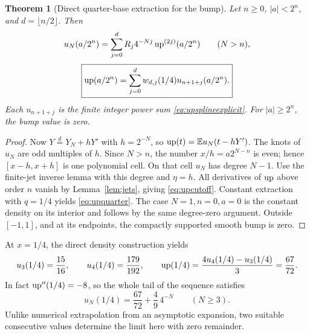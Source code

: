 \documentclass[11pt,oneside]{article}
\newtheorem{theorem}{Theorem}[section]
\theoremstyle{definition}\newtheorem{definition}[theorem]{Definition}
\theoremstyle{remark}\newtheorem{remark}[theorem]{Remark}
\begin{document}
\begin{theorem}[Direct quarter-base extraction for the bump]
\label{thm:upquarter}
Let $n\ge0$, $|a|<2^n$, and $d=\lfloor n/2\rfloor$. Then
\begin{equation}
 u_N(a/2^n)=\sum_{j=0}^{d}R_j4^{-Nj}\operatorname{up}^{(2j)}(a/2^n)
                  \qquad(N>n),
 \label{eq:upcutoff}
\end{equation}
\begin{equation}
 \boxed{\displaystyle
 \operatorname{up}(a/2^n)=\sum_{j=0}^{d}w_{d,j}(1/4)u_{n+1+j}(a/2^n).}
 \label{eq:upquarter}
\end{equation}
Each $u_{n+1+j}$ is the finite integer power sum
\eqref{eq:upsplineexplicit}. For $|a|\ge2^n$, the bump value is zero.
\end{theorem}
\begin{proof}
Now $Y\overset d=Y_N+hY'$ with $h=2^{-N}$, so
$\operatorname{up}(t)=\mathbb E u_N(t-hY')$. The knots of $u_N$ are odd multiples of $h$.
Since $N>n$, the number $x/h=a2^{N-n}$ is even; hence
$[x-h,x+h]$ is one polynomial cell. On that cell $u_N$ has degree $N-1$.
Use the finite-jet inverse lemma with this degree and $\eta=h$.
All derivatives of $\operatorname{up}$ above order $n$ vanish by Lemma~\ref{lem:jets},
giving \eqref{eq:upcutoff}. Constant extraction with $q=1/4$ yields
\eqref{eq:upquarter}. The case $N=1,n=0,a=0$ is the constant density on
its interior and follows by the same degree-zero argument. Outside
$[-1,1]$, and at its endpoints, the compactly supported smooth bump is zero.
\end{proof}

At $x=1/4$, the direct density construction yields
\[
 u_3(1/4)=\frac{15}{16},\qquad u_4(1/4)=\frac{179}{192},\qquad
 \operatorname{up}(1/4)=\frac{4u_4(1/4)-u_3(1/4)}3=\frac{67}{72}.
\]
In fact $\operatorname{up}''(1/4)=-8$, so the whole tail of the sequence satisfies
\begin{equation}
 u_N(1/4)=\frac{67}{72}+\frac49\,4^{-N}\qquad(N\ge3).
 \label{eq:upquarterexample}
\end{equation}
Unlike numerical extrapolation from an asymptotic expansion, two suitable
consecutive values determine the limit here with zero remainder.
\end{document}
